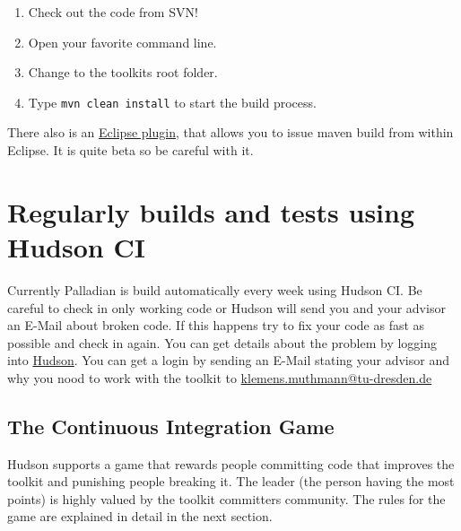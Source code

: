 \documentclass[a4paper,twoside]{book}      %
\begin{document}
\begin{enumerate}
\item Check out the code from SVN!
\item Open your favorite command line.
\item Change to the toolkits root folder.
\item Type \texttt{mvn clean install} to start the build process.
\end{enumerate}
There also is an \href{http://m2eclipse.sonatype.org/}{Eclipse plugin}, that allows you to issue maven build from within Eclipse. It is quite beta so be careful with it.
\section{Regularly builds and tests using Hudson CI}
Currently Palladian is build automatically every week using Hudson CI. Be careful to check in only working code or Hudson will send you and your advisor an E-Mail about broken code. If this happens try to fix your code as fast as possible and check in again. You can get details about the problem by logging into \href{http://www.effingo.de/hudson}{Hudson}. You can get a login by sending an E-Mail stating your advisor and why you nood to work with the toolkit to \href{mailto:klemens.muthmann@tu-dresden.de}{klemens.muthmann@tu-dresden.de}
\subsection{The Continuous Integration Game}
\label{sec:cigame}
Hudson supports a game that rewards people committing code that improves the toolkit and punishing people breaking it. The leader (the person having the most points) is highly valued by the toolkit committers community. The rules for the game are explained in detail in the next section.
\end{document}
